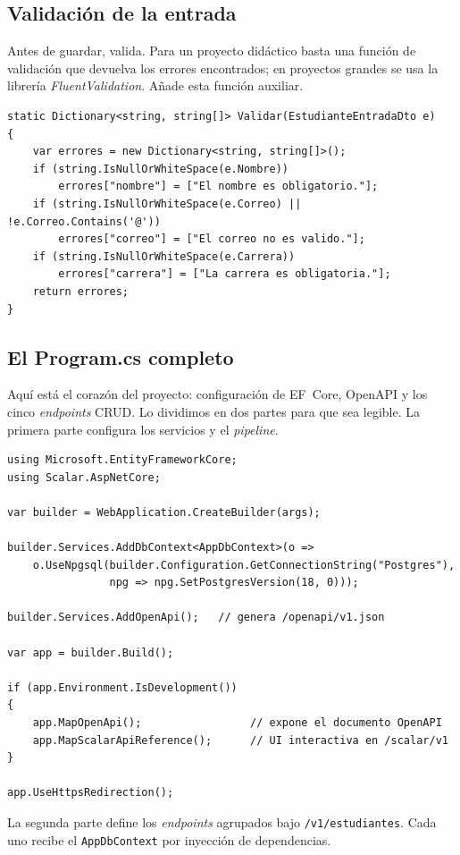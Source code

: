\documentclass[11pt]{article}
\begin{document}
\subsection{Validación de la entrada}
Antes de guardar, valida. Para un proyecto didáctico basta una función de validación que devuelva los errores encontrados; en proyectos grandes se usa la librería \emph{FluentValidation}. Añade esta función auxiliar.

\begin{cajacodigo}
\begin{lstlisting}[style=cs]
static Dictionary<string, string[]> Validar(EstudianteEntradaDto e)
{
    var errores = new Dictionary<string, string[]>();
    if (string.IsNullOrWhiteSpace(e.Nombre))
        errores["nombre"] = ["El nombre es obligatorio."];
    if (string.IsNullOrWhiteSpace(e.Correo) || !e.Correo.Contains('@'))
        errores["correo"] = ["El correo no es valido."];
    if (string.IsNullOrWhiteSpace(e.Carrera))
        errores["carrera"] = ["La carrera es obligatoria."];
    return errores;
}
\end{lstlisting}
\end{cajacodigo}

\subsection{El Program.cs completo}
Aquí está el corazón del proyecto: configuración de EF~Core, OpenAPI y los cinco \emph{endpoints} CRUD. Lo dividimos en dos partes para que sea legible. La primera parte configura los servicios y el \emph{pipeline}.

\begin{cajacodigo}
\begin{lstlisting}[style=cs]
using Microsoft.EntityFrameworkCore;
using Scalar.AspNetCore;

var builder = WebApplication.CreateBuilder(args);

builder.Services.AddDbContext<AppDbContext>(o =>
    o.UseNpgsql(builder.Configuration.GetConnectionString("Postgres"),
                npg => npg.SetPostgresVersion(18, 0)));

builder.Services.AddOpenApi();   // genera /openapi/v1.json

var app = builder.Build();

if (app.Environment.IsDevelopment())
{
    app.MapOpenApi();                 // expone el documento OpenAPI
    app.MapScalarApiReference();      // UI interactiva en /scalar/v1
}

app.UseHttpsRedirection();
\end{lstlisting}
\end{cajacodigo}
\vspace{2pt}
La segunda parte define los \emph{endpoints} agrupados bajo \texttt{/v1/estudiantes}. Cada uno recibe el \texttt{AppDbContext} por inyección de dependencias.
\end{document}
